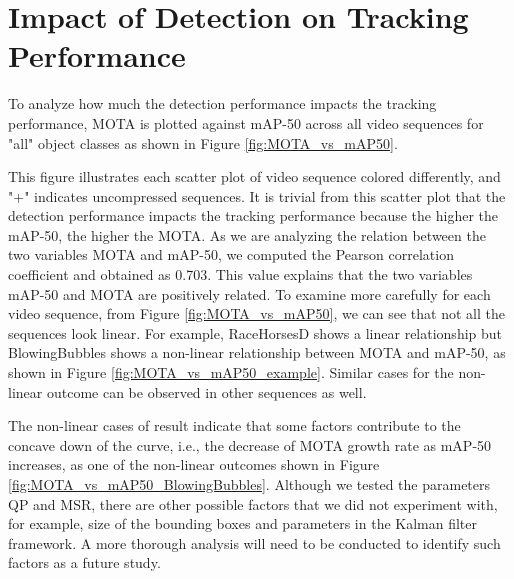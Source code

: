 \section{Impact of Detection on Tracking Performance}
\label{sec:results/section_c}

To analyze how much the detection performance impacts the tracking performance, MOTA is plotted against mAP-50 across all video sequences for "all" object classes as shown in Figure \ref{fig:MOTA_vs_mAP50}.

This figure illustrates each scatter plot of video sequence colored differently, and "+" indicates uncompressed sequences. It is trivial from this scatter plot that the detection performance impacts the tracking performance because the higher the mAP-50, the higher the MOTA. As we are analyzing the relation between the two variables MOTA and mAP-50, we computed the Pearson correlation coefficient and obtained as 0.703. This value explains that the two variables mAP-50 and MOTA are positively related. To examine more carefully for each video sequence, from Figure \ref{fig:MOTA_vs_mAP50}, we can see that not all the sequences look linear. For example, RaceHorsesD shows a linear relationship but BlowingBubbles shows a non-linear relationship between MOTA and mAP-50, as shown in Figure \ref{fig:MOTA_vs_mAP50_example}. Similar cases for the non-linear outcome can be observed in other sequences as well. 

The non-linear cases of result indicate that some factors contribute to the concave down of the curve, i.e., the decrease of MOTA growth rate as mAP-50 increases, as one of the non-linear outcomes shown in Figure \ref{fig:MOTA_vs_mAP50_BlowingBubbles}. Although we tested the parameters QP and MSR, there are other possible factors that we did not experiment with, for example, size of the bounding boxes and parameters in the Kalman filter framework. A more thorough analysis will need to be conducted to identify such factors as a future study.